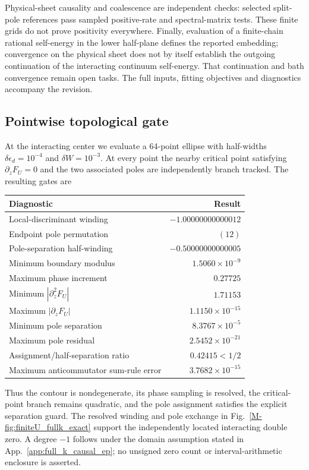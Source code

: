 \documentclass[%
  aps,physrev,onecolumn,10pt,amsmath,amssymb,superscriptaddress,longbibliography,floatfix
]{revtex4-2}
\begin{document}
Physical-sheet causality and coalescence are independent checks: selected
split-pole references pass sampled positive-rate and spectral-matrix tests.
These finite grids do not prove positivity everywhere. Finally, evaluation
of a finite-chain rational self-energy in the lower half-plane defines the
reported embedding; convergence on the physical sheet does not by itself
establish the outgoing continuation of the interacting continuum
self-energy. That continuation and bath convergence remain open tasks.
The full inputs, fitting objectives and diagnostics accompany the revision.


\subsection{Pointwise topological gate}

At the interacting center we evaluate a 64-point ellipse with half-widths
\(\delta\epsilon_d=10^{-4}\) and \(\delta W=10^{-3}\).  At every point the
nearby critical point satisfying \(\partial_zF_U=0\) and the two associated
poles are independently branch tracked.  The resulting gates are
\begin{center}
\begin{tabular}{@{}p{}r@{}}
\toprule
Diagnostic & Result\\
\midrule
Local-discriminant winding & \(-1.00000000000012\)\\
Endpoint pole permutation & \((12)\)\\
Pole-separation half-winding & \(-0.50000000000005\)\\
Minimum boundary modulus & \(1.5060\times10^{-9}\)\\
Maximum phase increment & \(0.27725\)\\
Minimum \(|\partial_z^2F_U|\) & \(1.71153\)\\
Maximum \(|\partial_zF_U|\) & \(1.1150\times10^{-15}\)\\
Minimum pole separation & \(8.3767\times10^{-5}\)\\
Maximum pole residual & \(2.5452\times10^{-21}\)\\
Assignment/half-separation ratio & \(0.42415<1/2\)\\
Maximum anticommutator sum-rule error & \(3.7682\times10^{-15}\)\\
\bottomrule
\end{tabular}
\end{center}
Thus the contour is nondegenerate, its phase sampling is resolved, the
critical-point branch remains quadratic, and the pole assignment satisfies
the explicit separation guard.  The resolved winding and pole exchange in
Fig.~\ref{M-fig:finiteU_fullk_exact} support the independently located
interacting double zero.  A degree $-1$ follows under the domain assumption
stated in App.~\ref{app:full_k_causal_ep}; no unsigned zero count or
interval-arithmetic enclosure is asserted.
\end{document}
